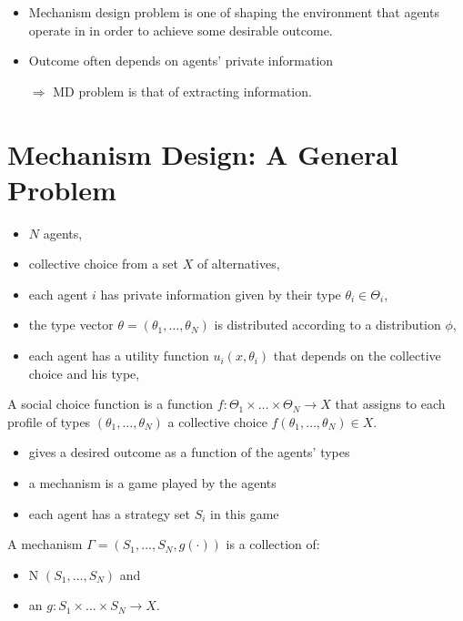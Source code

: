 \documentclass[english]{beamer}		%
\def\lyxframeend{} %
\begin{document}
\begin{itemize}
	\item Mechanism design problem is one of shaping the environment that agents operate in in order to achieve some desirable outcome.
	\item Outcome often depends on agents' private information 
	
	$\Rightarrow$ MD problem is that of extracting information.
\end{itemize}
\lyxframeend




\section{Mechanism Design: A General Problem}

\begin{itemize}
	\item $N$ agents,
	\item collective choice from a set $X$ of alternatives,
	\item each agent $i$ has private information given by their type $\theta_i\in\Theta_{i}$,
	\item the type vector $\theta=(\theta_1,\dots,\theta_{N})$ is distributed according to a distribution $\phi$,
	\item each agent has a utility function $u_{i}(x,\theta_{i})$ that depends on the collective choice and his type,
\end{itemize}
\lyxframeend


\begin{definition}
	A \alert{social choice function} is a function $f:\Theta_{1}\times \dots\times\Theta_{N}\rightarrow X$ that assigns to each profile of types $(\theta_{1},\dots,\theta_{N})$ a collective choice $f(\theta_{1},\dots,\theta_{N})\in X$.
\end{definition}
\begin{itemize}
	\item gives a desired outcome as a function of the agents' types
\end{itemize}
\lyxframeend


\begin{itemize}
	\item a mechanism is a game played by the agents
	\item each agent has a strategy set $S_{i}$ in this game
\end{itemize}
\begin{definition}[mechanism]
	A \alert{mechanism} $\Gamma=(S_{1},\dots,S_{N},g(\cdot))$ is a collection of: 
	\begin{itemize}
		\item N  $(S_{1},\dots,S_{N})$ and 
		\item an  $g:S_{1}\times\dots\times S_{N}\rightarrow X$.
	\end{itemize}
\end{definition}
\lyxframeend
\end{document}
